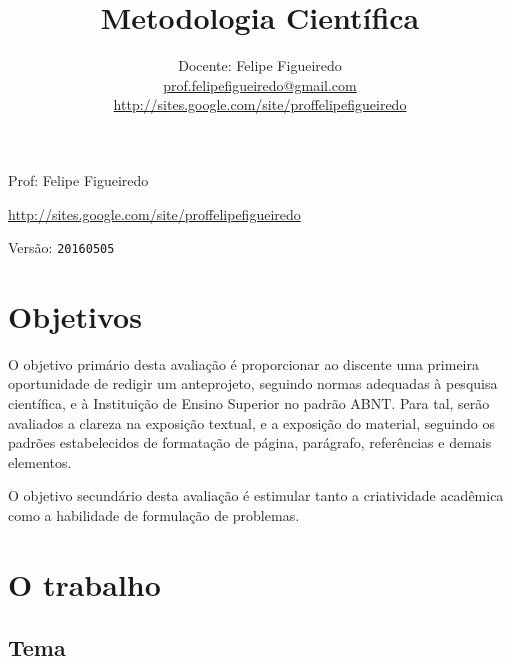 \documentclass[a4paper]{article}
\title{Metodologia Científica}
\date{}
\author{Docente: Felipe Figueiredo\\
  \url{prof.felipefigueiredo@gmail.com}\\
  \url{http://sites.google.com/site/proffelipefigueiredo}
}
\begin{document}
\maketitle
{}

\newpage

\parbox[c]{.825\textwidth}{\raggedright%
{Prof: Felipe Figueiredo\par}
{\url{http://sites.google.com/site/proffelipefigueiredo}\par}
}

Versão: \verb|20160505|




\section{Objetivos}
O objetivo primário desta avaliação é proporcionar ao discente uma primeira oportunidade de redigir um anteprojeto, seguindo normas adequadas à pesquisa científica, e à Instituição de Ensino Superior no padrão ABNT.
Para tal, serão avaliados a clareza na exposição textual, e a exposição do material, seguindo os padrões estabelecidos de formatação de página, parágrafo, referências e demais elementos.

O objetivo secundário desta avaliação é estimular tanto a criatividade acadêmica como a habilidade de formulação de problemas.

\section{O trabalho}

\subsection{Tema}
\end{document}

